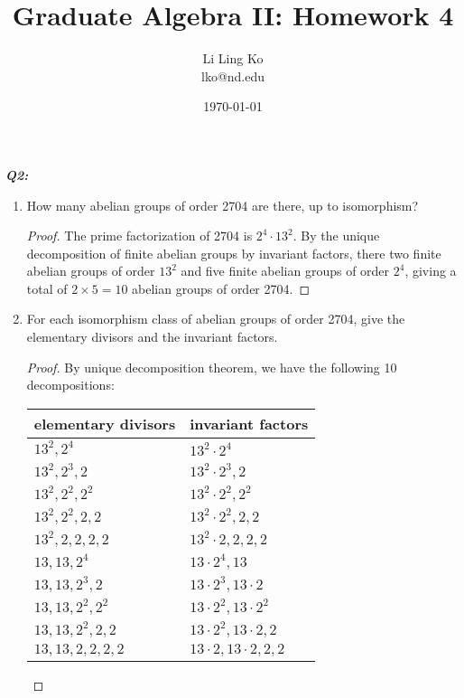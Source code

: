 \documentclass{article}
\begin{document}
\title{Graduate Algebra II: Homework 4}
\author{Li Ling Ko\\ lko@nd.edu}
\date{\today}
\maketitle

\it \textbf{Q2:}
  \begin{enumerate}[label={(\alph*)}]
    \item How many abelian groups of order 2704 are there, up to
      isomorphism?
      \begin{proof}
        The prime factorization of 2704 is $2^4\cdot13^2$. By the
        unique decomposition of finite abelian groups by invariant factors,
        there two finite abelian groups of order $13^2$ and five finite
        abelian groups of order $2^4$, giving a total of $2\times5=10$
        abelian groups of order 2704.
      \end{proof}

    \item For each isomorphism class of abelian groups of order 2704, give
      the elementary divisors and the invariant factors.
      \begin{proof}
        By unique decomposition theorem, we have the following 10
        decompositions:
        \begin{table}[h]
          \begin{center}
            \begin{tabular}{ll}
              elementary divisors &invariant factors\\
              \hline
              $13^2,2^4$ &$13^2\cdot2^4$\\
              $13^2,2^3,2$ &$13^2\cdot2^3,2$\\
              $13^2,2^2,2^2$ &$13^2\cdot2^2,2^2$\\
              $13^2,2^2,2,2$ &$13^2\cdot2^2,2,2$\\
              $13^2,2,2,2,2$ &$13^2\cdot2,2,2,2$\\
              $13,13,2^4$ &$13\cdot2^4,13$\\
              $13,13,2^3,2$ &$13\cdot2^3,13\cdot2$\\
              $13,13,2^2,2^2$ &$13\cdot2^2,13\cdot2^2$\\
              $13,13,2^2,2,2$ &$13\cdot2^2,13\cdot2,2$\\
              $13,13,2,2,2,2$ &$13\cdot2,13\cdot2,2,2$\\
            \end{tabular}
          \end{center}
        \end{table}
      \end{proof}
  \end{enumerate}
\end{document}
